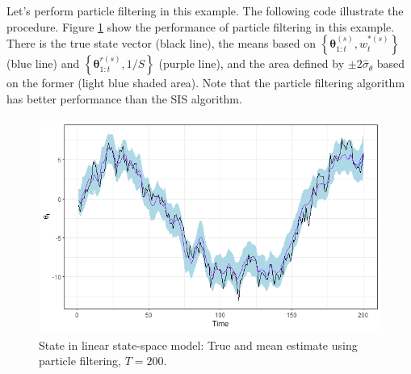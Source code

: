 Let's perform particle filtering in this example. The following code illustrate the procedure. Figure \ref{fig510} show the performance of particle filtering in this example. There is the true state vector (black line), the means based on $\left\{\bm{\theta}_{1:t}^{(s)},w_t^{*(s)}\right\}$ (blue line) and  $\left\{\bm{\theta}_{1:t}^{r(s)},1/S\right\}$ (purple line), and the area defined by $\pm2\hat{\sigma}_{\theta}$ based on the former (light blue shaded area). Note that the particle filtering algorithm has better performance than the SIS algorithm.   

\begin{figure}[!h]
	\includegraphics[width=340pt, height=200pt]{Chapters/chapter5/figures/PF.png}
	\caption[List of figure caption goes here]{State in linear state-space model: True and mean estimate using particle filtering, $T=200$.}\label{fig510}
\end{figure} 

